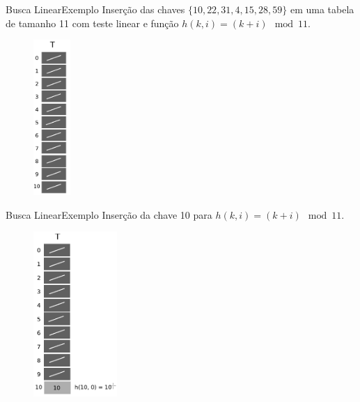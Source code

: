 \documentclass[aspectratio=169]{beamer}
\begin{document}

\begin{frame}{Busca Linear}{Exemplo}
Inserção das chaves $\{10, 22, 31, 4, 15, 28, 59\}$ em uma tabela de tamanho 11 com teste linear e função $h(k, i) = (k + i) \mod 11$.
\begin{figure}[!h]
  \centering
  \includegraphics[width=40pt]{imagens/ex_enderecamento_aberto1.png}
  \label{fig_ex_enderecamento_aberto1}
\end{figure}
\end{frame}

\begin{frame}{Busca Linear}{Exemplo}
Inserção da chave 10 para $h(k, i) = (k + i) \mod 11$.
\begin{figure}[!h]
  \centering
  \includegraphics[width=90pt]{imagens/ex_enderecamento_aberto2.png}
  \label{fig_ex_enderecamento_aberto2}
\end{figure}
\end{frame}
\end{document}
